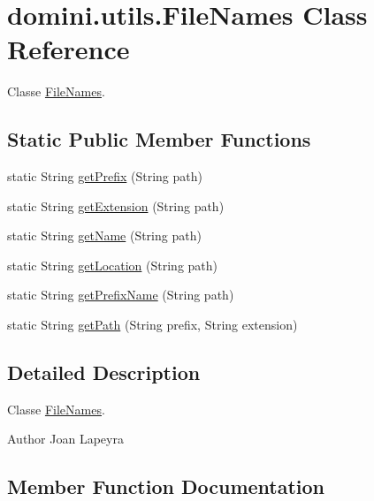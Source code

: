 \hypertarget{classdomini_1_1utils_1_1FileNames}{}\section{domini.\+utils.\+File\+Names Class Reference}
\label{classdomini_1_1utils_1_1FileNames}


Classe \hyperlink{classdomini_1_1utils_1_1FileNames}{File\+Names}.  


\subsection*{Static Public Member Functions}
\begin{DoxyCompactItemize}
\item 
static String \hyperlink{classdomini_1_1utils_1_1FileNames_a217ed1d50727e5109fdbd626a3b5bf07}{get\+Prefix} (String path)
\item 
static String \hyperlink{classdomini_1_1utils_1_1FileNames_af743111d2e036c165270edc4056c19e2}{get\+Extension} (String path)
\item 
static String \hyperlink{classdomini_1_1utils_1_1FileNames_ade42cac265a0eb6d3bbccc671f669253}{get\+Name} (String path)
\item 
static String \hyperlink{classdomini_1_1utils_1_1FileNames_afc75fde5e21552878f174ad4f28fcf21}{get\+Location} (String path)
\item 
static String \hyperlink{classdomini_1_1utils_1_1FileNames_afcfe1e3bb1f49c70807fcd66a21d2b9a}{get\+Prefix\+Name} (String path)
\item 
static String \hyperlink{classdomini_1_1utils_1_1FileNames_a12c91817013f1485a2318621f3fc1312}{get\+Path} (String prefix, String extension)
\end{DoxyCompactItemize}


\subsection{Detailed Description}
Classe \hyperlink{classdomini_1_1utils_1_1FileNames}{File\+Names}. 

\begin{DoxyAuthor}{Author}
Joan Lapeyra 
\end{DoxyAuthor}


\subsection{Member Function Documentation}
\mbox{\label{classdomini_1_1utils_1_1FileNames_af743111d2e036c165270edc4056c19e2}} 
